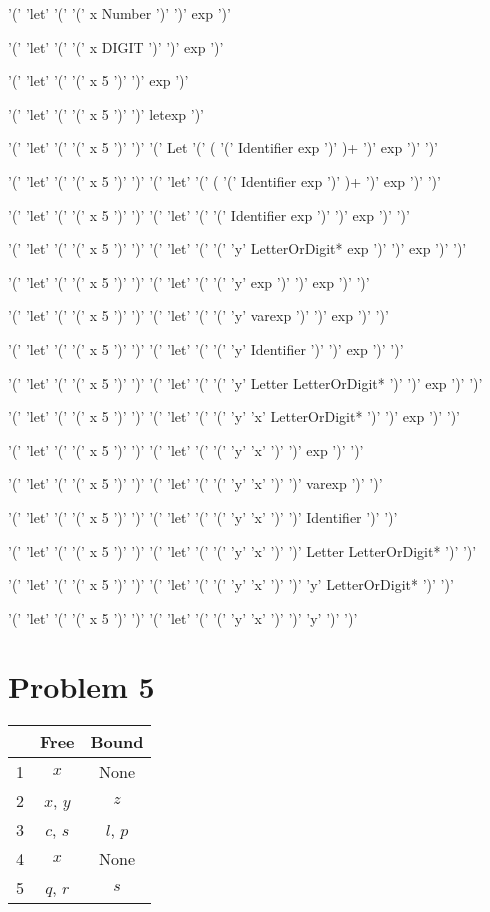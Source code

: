 \documentclass[11pt]{article}
\begin{document}
\begin{enumerate}
	'(' 'let' '(' '(' x Number ')' ')' exp ')'

	'(' 'let' '(' '(' x DIGIT ')' ')' exp ')'

	'(' 'let' '(' '(' x 5 ')' ')' exp ')'

	'(' 'let' '(' '(' x 5 ')' ')' letexp ')'

	'(' 'let' '(' '(' x 5 ')' ')' '(' Let '(' ( '(' Identifier exp ')' )+ ')' exp ')' ')'

	'(' 'let' '(' '(' x 5 ')' ')' '(' 'let' '(' ( '(' Identifier exp ')' )+ ')' exp ')' ')'

	'(' 'let' '(' '(' x 5 ')' ')' '(' 'let' '(' '(' Identifier exp ')' ')' exp ')' ')'

	'(' 'let' '(' '(' x 5 ')' ')' '(' 'let' '(' '(' 'y' LetterOrDigit* exp ')' ')' exp ')' ')'

	'(' 'let' '(' '(' x 5 ')' ')' '(' 'let' '(' '(' 'y' exp ')' ')' exp ')' ')'

	'(' 'let' '(' '(' x 5 ')' ')' '(' 'let' '(' '(' 'y' varexp ')' ')' exp ')' ')'

	'(' 'let' '(' '(' x 5 ')' ')' '(' 'let' '(' '(' 'y' Identifier ')' ')' exp ')' ')'

	'(' 'let' '(' '(' x 5 ')' ')' '(' 'let' '(' '(' 'y' Letter LetterOrDigit* ')' ')' exp ')' ')'

	'(' 'let' '(' '(' x 5 ')' ')' '(' 'let' '(' '(' 'y' 'x' LetterOrDigit* ')' ')' exp ')' ')'

	'(' 'let' '(' '(' x 5 ')' ')' '(' 'let' '(' '(' 'y' 'x' ')' ')' exp ')' ')'

	'(' 'let' '(' '(' x 5 ')' ')' '(' 'let' '(' '(' 'y' 'x' ')' ')' varexp ')' ')'

	'(' 'let' '(' '(' x 5 ')' ')' '(' 'let' '(' '(' 'y' 'x' ')' ')' Identifier ')' ')'

	'(' 'let' '(' '(' x 5 ')' ')' '(' 'let' '(' '(' 'y' 'x' ')' ')' Letter LetterOrDigit* ')' ')'

	'(' 'let' '(' '(' x 5 ')' ')' '(' 'let' '(' '(' 'y' 'x' ')' ')' 'y' LetterOrDigit* ')' ')'

	'(' 'let' '(' '(' x 5 ')' ')' '(' 'let' '(' '(' 'y' 'x' ')' ')' 'y' ')' ')'

\end{enumerate}



\section*{Problem 5}

\begin{tabular}{| c | c| c |}
	\hline
	& Free & Bound \\
	\hline
	1 & $x$ & None \\
	\hline
	2 & $x$, $y$ & $z$ \\
	\hline
	3 & $c$, $s$ & $l$, $p$ \\
	\hline
	4 & $x$ & None \\
	\hline
	5 & $q$, $r$ & $s$ \\
	\hline
\end{tabular}
\end{document}
